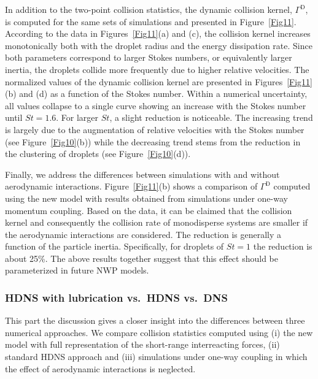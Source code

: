 \documentclass[../thesis.tex]{subfiles}
\begin{document}
In addition to the two-point collision statistics, the dynamic collision kernel, $\Gamma^\text{D}$, is computed for the same sets of simulations and presented in Figure~\ref{Fig11}. According to the data in Figures~\ref{Fig11}(a) and (c), the collision kernel increases monotonically both with the droplet radius and the energy dissipation rate. Since both parameters correspond to larger Stokes numbers, or equivalently larger inertia, the droplets collide more frequently due to higher relative velocities. The normalized values of the dynamic collision kernel are presented in Figures~\ref{Fig11}(b) and (d) as a function of the Stokes number. Within a numerical uncertainty, all values collapse to a single curve showing an increase with the Stokes number until $St = 1.6$. For larger $St$, a slight reduction is noticeable. The increasing trend is largely due to the augmentation of relative velocities with the Stokes number (see Figure~\ref{Fig10}(b)) while the decreasing trend stems from the reduction in the clustering of droplets (see Figure~\ref{Fig10}(d)).

Finally, we address the differences between simulations with and without aerodynamic interactions. Figure~\ref{Fig11}(b) shows a comparison of $\Gamma^\text{D}$ computed using the new model with results obtained from simulations under one-way momentum coupling. Based on the data, it can be claimed that the collision kernel and consequently the collision rate of monodisperse systems are smaller if the aerodynamic interactions are considered. The reduction is generally a function of the particle inertia. Specifically, for droplets of $St=1$ the reduction is about 25\%. The above results together suggest that this effect should be parameterized in future NWP models. 

\subsubsection{HDNS with lubrication vs.\ HDNS vs.\ DNS}
This part the discussion gives a closer insight into the differences between three numerical approaches. We compare collision statistics computed using (i) the new model with full representation of the short-range interreacting forces, (ii) standard HDNS approach and (iii) simulations under one-way coupling in which the effect of aerodynamic interactions is neglected.
\end{document}
